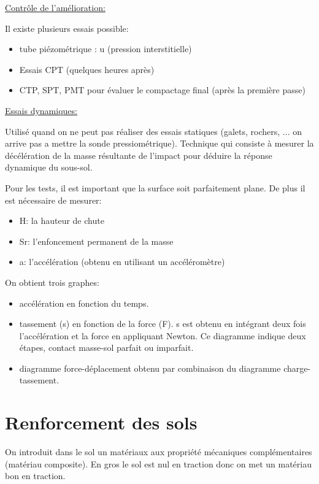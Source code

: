 \medskip

\underline{Contrôle de l'amélioration:} 

Il existe plusieurs essais possible:
\begin{itemize}
    \item tube piézométrique : u (pression interstitielle)
    \item Essais CPT (quelques heures après)
    \item CTP, SPT, PMT pour évaluer le compactage final (après la première passe)
\end{itemize}

\medskip

\underline{Essais dynamiques:}

Utilisé quand on ne peut pas réaliser des essais statiques (galets, rochers, ... on arrive pas a mettre la sonde pressiométrique). Technique qui consiste à mesurer la décélération de la masse résultante de l'impact pour déduire la réponse dynamique du sous-sol.

Pour les tests, il est important que la surface soit parfaitement plane. De plus il est nécessaire de mesurer:
\begin{itemize}
    \item H: la hauteur de chute
    \item Sr: l'enfoncement permanent de la masse
    \item a: l'accélération (obtenu en utilisant un accéléromètre)
\end{itemize} 
 
\medskip
 
 On obtient trois graphes:
 \begin{itemize}
     \item accélération en fonction du temps.
     \item tassement (s) en fonction de la force (F). s est obtenu en intégrant deux fois l'accélération et la force en appliquant Newton. Ce diagramme indique deux étapes, contact masse-sol parfait ou imparfait.
     \item diagramme force-déplacement obtenu par combinaison du diagramme charge-tassement.
 \end{itemize}
 
 \section{Renforcement des sols}
 
 On introduit dans le sol un matériaux aux propriété mécaniques complémentaires (matériau composite). En gros le sol est nul en traction donc on met un matériau bon en traction.
 
